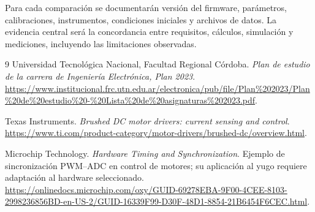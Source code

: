 \documentclass[11pt,a4paper]{article}
\begin{document}
Para cada comparación se documentarán versión del firmware, parámetros,
calibraciones, instrumentos, condiciones iniciales y archivos de datos.
La evidencia central será la concordancia entre requisitos, cálculos,
simulación y mediciones, incluyendo las limitaciones observadas.

\begin{thebibliography}{9}
Universidad Tecnológica Nacional, Facultad Regional Córdoba.
\textit{Plan de estudio de la carrera de Ingeniería Electrónica, Plan 2023}.
\url{https://www.institucional.frc.utn.edu.ar/electronica/pub/file/Plan%202023/Plan%20de%20estudio%20-%20Lista%20de%20asignaturas%202023.pdf}.

Texas Instruments.
\textit{Brushed DC motor drivers: current sensing and control}.
\url{https://www.ti.com/product-category/motor-drivers/brushed-dc/overview.html}.

Microchip Technology.
\textit{Hardware Timing and Synchronization}.
Ejemplo de sincronización PWM--ADC en control de motores; su aplicación
al yugo requiere adaptación al hardware seleccionado.
\url{https://onlinedocs.microchip.com/oxy/GUID-69278EBA-9F00-4CEE-8103-2998236856BD-en-US-2/GUID-16339F99-D30F-48D1-8854-21B6454F6CEC.html}.
\end{thebibliography}
\end{document}
